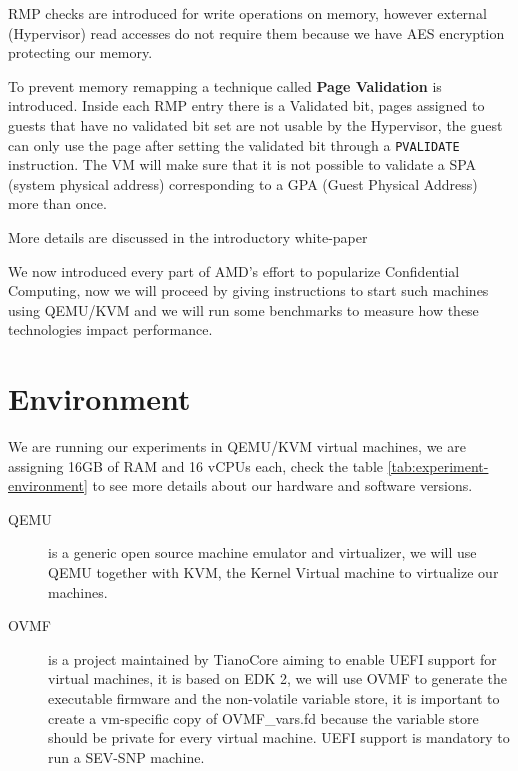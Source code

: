 \documentclass[twocolumn]{article}
\begin{document}
    RMP checks are introduced for write operations on memory, however external (Hypervisor) read accesses do not require them because we have AES encryption protecting our memory.

    To prevent memory remapping a technique called \textbf{Page Validation} is introduced.
    Inside each RMP entry there is a Validated bit, pages assigned to guests that have no validated bit set are not usable by the Hypervisor, the guest can only use the page after setting the validated bit through a \texttt{PVALIDATE} instruction. The VM will make sure that it is not possible to validate a SPA (system physical address) corresponding to a GPA (Guest Physical Address) more than once.
 
    More details are discussed in the introductory white-paper \cite{sev-snp}

    We now introduced every part of AMD's effort to popularize Confidential Computing, now we will proceed by giving instructions to start such machines using QEMU/KVM and we will run some benchmarks to measure how these technologies impact performance.


\section{Environment}
\label{sec:environment}
    We are running our experiments in QEMU/KVM virtual machines, we are assigning 16GB of RAM and 16 vCPUs each, check the table \ref*{tab:experiment-environment} to see more details about our hardware and software versions. 

    \begin{description}
        \item[QEMU] is a generic open source machine emulator and virtualizer, we will use QEMU together with KVM, the Kernel Virtual machine to virtualize our machines.
        \item[OVMF] is a project maintained by TianoCore aiming to enable UEFI support for virtual machines, it is based on EDK 2, we will use OVMF to generate the executable firmware and the non-volatile variable store, it is important to create a vm-specific copy of OVMF\_vars.fd because the variable store should be private for every virtual machine. UEFI support is mandatory to run a SEV-SNP machine.
    \end{description}
\end{document}
